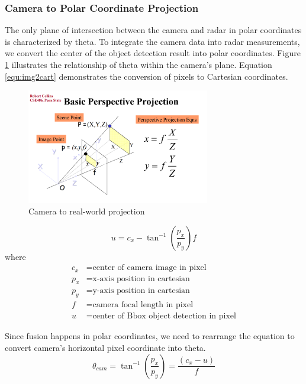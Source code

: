 \subsubsection{Camera to Polar Coordinate Projection}
The only plane of intersection between the camera and radar in polar coordinates is characterized by theta. 
To integrate the camera data into radar measurements, 
we convert the center of the object detection result into polar coordinates. 
Figure \ref{fig:camera_projection} illustrates the relationship of theta within the camera's plane. 
Equation \ref{equ:img2cart} demonstrates the conversion of pixels to Cartesian coordinates.
\begin{figure}[hpbt]
    \centering
    \includegraphics[width=8cm]{Figures/cam_projection.png}%
    \caption{Camera to real-world projection}
    \label{fig:camera_projection}
\end{figure}

\begin{equation}\label{equ:img2cart}
u=c_x-\tan^{-1}(\frac{p_x}{p_y})f
\end{equation}
where
\begin{align*}
    c_x &=\text{center of camera image in pixel}\\
    p_x &=\text{x-axis position in cartesian}\\
    p_y &=\text{y-axis position in cartesian}\\
    f &=\text{camera focal length in pixel}\\
    u &=\text{center of Bbox object detection in pixel}
\end{align*}

Since fusion happens in polar coordinates, we need to rearrange the equation to convert camera's horizontal pixel coordinate into theta.
\begin{equation}\label{equ:2_cam_px}
    \theta_{cam}=
    \tan^{-1}(\frac{p_x}{p_y})=
    \frac
    {(c_x-u)}
    {f}
\end{equation}

